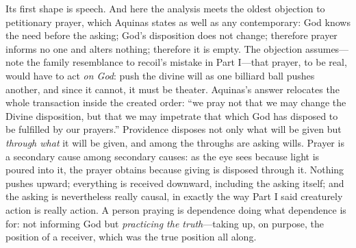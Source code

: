 Its first shape is speech. And here the analysis meets the oldest objection to petitionary prayer, which Aquinas states as well as any contemporary: God knows the need before the asking; God's disposition does not change; therefore prayer informs no one and alters nothing; therefore it is empty. The objection assumes---note the family resemblance to recoil's mistake in Part I---that prayer, to be real, would have to act \emph{on God}: push the divine will as one billiard ball pushes another, and since it cannot, it must be theater. Aquinas's answer relocates the whole transaction inside the created order: ``we pray not that we may change the Divine disposition, but that we may impetrate that which God has disposed to be fulfilled by our prayers.'' Providence disposes not only what will be given but \emph{through what} it will be given, and among the throughs are asking wills. Prayer is a secondary cause among secondary causes: as the eye sees because light is poured into it, the prayer obtains because giving is disposed through it. Nothing pushes upward; everything is received downward, including the asking itself; and the asking is nevertheless really causal, in exactly the way Part I said creaturely action is really action. A person praying is dependence doing what dependence is for: not informing God but \emph{practicing the truth}---taking up, on purpose, the position of a receiver, which was the true position all along.

